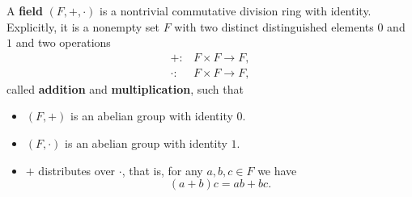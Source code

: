\begin{definition}\label{def:field}\cite[142]{Knapp2016BAlg}
  A \textbf{field} \( (F, +, \cdot) \) is a nontrivial commutative division ring with identity. Explicitly, it is a nonempty set \( F \) with two distinct distinguished elements \( 0 \) and \( 1 \) and two operations
  \begin{align*}
    +: &F \times F \to F, \\
    \cdot: &F \times F \to F,
  \end{align*}
  called \textbf{addition} and \textbf{multiplication}, such that
  \begin{itemize}
    \item \( (F, +) \) is an abelian group with identity \( 0 \).
    \item \( (F, \cdot) \) is an abelian group with identity \( 1 \).
    \item \( + \) distributes over \( \cdot \), that is, for any \( a, b, c \in F \) we have
    \begin{equation*}
      (a + b)c = ab + bc.
    \end{equation*}
  \end{itemize}
\end{definition}
